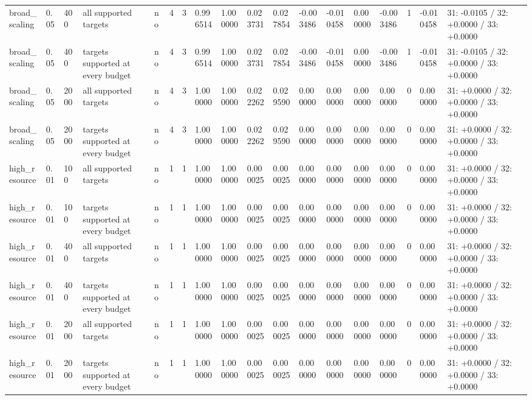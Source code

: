 \begin{tabular}{llllllllllllllllll}
broad\_scaling & 0.05 & 400 & all supported targets & no & 4 & 3 & 0.996514 & 1.000000 & 0.023731 & 0.027854 & -0.003486 & -0.010458 & 0.000000 & -0.003486 & 1 & -0.010458 & 31: -0.0105 / 32: +0.0000 / 33: +0.0000 \\
broad\_scaling & 0.05 & 400 & targets supported at every budget & no & 4 & 3 & 0.996514 & 1.000000 & 0.023731 & 0.027854 & -0.003486 & -0.010458 & 0.000000 & -0.003486 & 1 & -0.010458 & 31: -0.0105 / 32: +0.0000 / 33: +0.0000 \\
broad\_scaling & 0.05 & 2000 & all supported targets & no & 4 & 3 & 1.000000 & 1.000000 & 0.022262 & 0.029590 & 0.000000 & 0.000000 & 0.000000 & 0.000000 & 0 & 0.000000 & 31: +0.0000 / 32: +0.0000 / 33: +0.0000 \\
broad\_scaling & 0.05 & 2000 & targets supported at every budget & no & 4 & 3 & 1.000000 & 1.000000 & 0.022262 & 0.029590 & 0.000000 & 0.000000 & 0.000000 & 0.000000 & 0 & 0.000000 & 31: +0.0000 / 32: +0.0000 / 33: +0.0000 \\
high\_resource & 0.01 & 100 & all supported targets & no & 1 & 1 & 1.000000 & 1.000000 & 0.000025 & 0.000025 & 0.000000 & 0.000000 & 0.000000 & 0.000000 & 0 & 0.000000 & 31: +0.0000 / 32: +0.0000 / 33: +0.0000 \\
high\_resource & 0.01 & 100 & targets supported at every budget & no & 1 & 1 & 1.000000 & 1.000000 & 0.000025 & 0.000025 & 0.000000 & 0.000000 & 0.000000 & 0.000000 & 0 & 0.000000 & 31: +0.0000 / 32: +0.0000 / 33: +0.0000 \\
high\_resource & 0.01 & 400 & all supported targets & no & 1 & 1 & 1.000000 & 1.000000 & 0.000025 & 0.000025 & 0.000000 & 0.000000 & 0.000000 & 0.000000 & 0 & 0.000000 & 31: +0.0000 / 32: +0.0000 / 33: +0.0000 \\
high\_resource & 0.01 & 400 & targets supported at every budget & no & 1 & 1 & 1.000000 & 1.000000 & 0.000025 & 0.000025 & 0.000000 & 0.000000 & 0.000000 & 0.000000 & 0 & 0.000000 & 31: +0.0000 / 32: +0.0000 / 33: +0.0000 \\
high\_resource & 0.01 & 2000 & all supported targets & no & 1 & 1 & 1.000000 & 1.000000 & 0.000025 & 0.000025 & 0.000000 & 0.000000 & 0.000000 & 0.000000 & 0 & 0.000000 & 31: +0.0000 / 32: +0.0000 / 33: +0.0000 \\
high\_resource & 0.01 & 2000 & targets supported at every budget & no & 1 & 1 & 1.000000 & 1.000000 & 0.000025 & 0.000025 & 0.000000 & 0.000000 & 0.000000 & 0.000000 & 0 & 0.000000 & 31: +0.0000 / 32: +0.0000 / 33: +0.0000 \\

\end{tabular}
